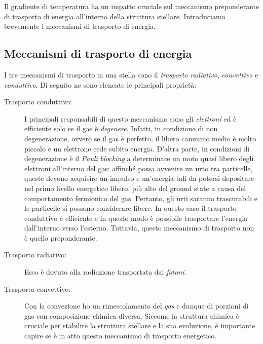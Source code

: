 Il gradiente di temperatura ha un impatto cruciale sul meccanismo preponderante di trasporto di energia all'interno della struttura stellare. Introduciamo brevemente i meccanismi di trasporto di energia.

\subsection{Meccanismi di trasporto di energia}
I tre meccanismi di trasporto in una stella sono il \emph{trasporto radiativo}, \emph{convettivo} e \emph{conduttivo}. Di seguito ne sono elencate le principali proprietà:
\begin{description}
    \item[Trasporto conduttivo:] I principali responsabili di questo meccanismo sono gli \emph{elettroni} ed è efficiente solo se il gas è \emph{degenere}. Infatti, in condizione di non degenerazione, ovvero se il gas è perfetto, il libero cammino medio è molto piccolo e un elettrone cede subito energia. D'altra parte, in condizioni di degenerazione è il \emph{Pauli blocking} a determinare un moto quasi libero degli elettroni all'interno del gas: affinché possa avvenire un urto tra particelle, queste devono acquisire un impulso e un'energia tali da potersi depositare nel primo livello energetico libero, più alto del ground state a causa del comportamento fermionico del gas. Pertanto, gli urti saranno trascurabili e le particelle si possono considerare libere. In questo caso il trasporto conduttivo è efficiente e in questo modo è possibile trasportare l'energia dall'interno verso l'esterno. Tuttavia, questo meccanismo di trasporto non è quello preponderante.
    \item[Trasporto radiativo:] Esso è dovuto alla radiazione trasportata dai \emph{fotoni}.
    \item[Trasporto convettivo:] Con la convezione ho un rimescolamento del \emph{gas} e dunque di porzioni di gas con composizione chimica diversa. Siccome la struttura chimica è cruciale per stabilire la struttura stellare e la sua evoluzione, è importante capire se è in atto questo meccanismo di trasporto energetico.
\end{description}

